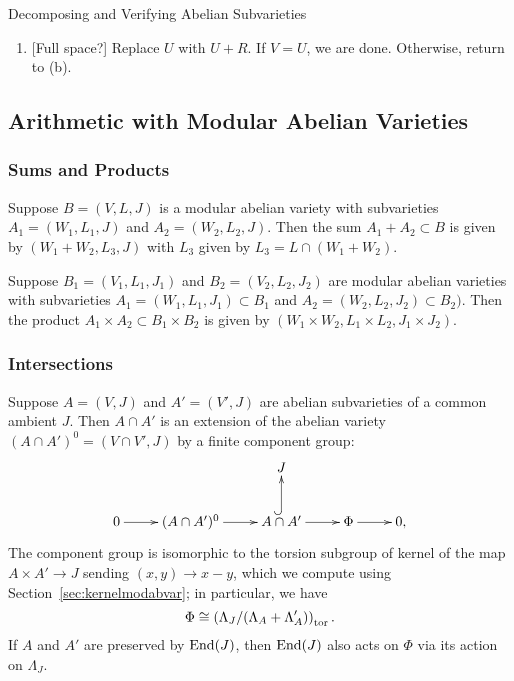 \documentclass{article}
\begin{document}
\begin{algorithm}{Decomposing and Verifying Abelian Subvarieties}
\begin{enumerate}
\begin{enumerate}
			            Choose any $v\in V\setminus U$. By
			            Proposition~\ref{prop:integral_degen}, if $W$ is an abelian
			            subvariety then there exists $q_1,\ldots,q_r$
			            such that $v\in \Im \left(\sum_{i=1} ^r q_i
				            \delta_i\right)$. If this is not the case, return
			            'NO'. Let $R = \Im \left(\sum_{i=1} ^r q_i
				            \delta_i\right)$. If $R\not\subset V$, return 'NO'.
			      \item{} [Full space?]
			            Replace $U$ with $U+R$. If $V=U$, we are done. Otherwise,
			            return to (b).
		      \end{enumerate}
	\end{enumerate}
\end{algorithm}


\subsection{Arithmetic with Modular Abelian Varieties}

\subsubsection{Sums and Products}

Suppose $B=(V, L, J)$ is a modular abelian variety with subvarieties $A_1=(W_1,
	L_1, J)$ and $A_2=(W_2, L_2, J)$. Then the sum $A_1+A_2\subset B$ is given by
$(W_1+W_2, L_3, J)$ with $L_3$ given by $L_3 = L\cap (W_1+W_2)$.

Suppose $B_1=(V_1, L_1, J_1)$ and $B_2=(V_2, L_2, J_2)$ are modular abelian
varieties with subvarieties $A_1=(W_1, L_1, J_1)\subset B_1$ and $A_2=(W_2,
	L_2, J_2)\subset B_2)$. Then the product $A_1\times A_2\subset B_1\times
	B_2$ is given by $(W_1\times W_2, L_1\times L_2, J_1\times J_2)$.

\subsubsection{Intersections}


Suppose $A = (V,J)$ and $A' = (V', J)$ are abelian subvarieties of a
common ambient $J$.  Then $A\cap A'$ is an extension of the abelian
variety $(A\cap A')^0 = (V\cap V', J)$ by a finite component group:
$$
	\xymatrix{
		& & J & & \\
		0\ar[r]& (A\cap A')^0 \ar[r]&  A\cap A'\ar@{^(->}[u] \ar[r]& \Phi\ar[r] & 0,
	}
$$
The component group is isomorphic to the torsion subgroup of kernel of
the map $A \times A' \to J$ sending $(x,y)\to x-y$, which we compute
using Section~\ref{sec:kernelmodabvar}; in particular, we have
$$
	\Phi \cong \left( \Lambda_J/(\Lambda_A + \Lambda_A')\right)_{\operatorname{tor}}.
$$
If $A$ and $A'$ are preserved by $\operatorname{End}(J)$, then $\operatorname{End}(J)$ also
acts on $\Phi$ via its action on $\Lambda_J$.
\end{document}
